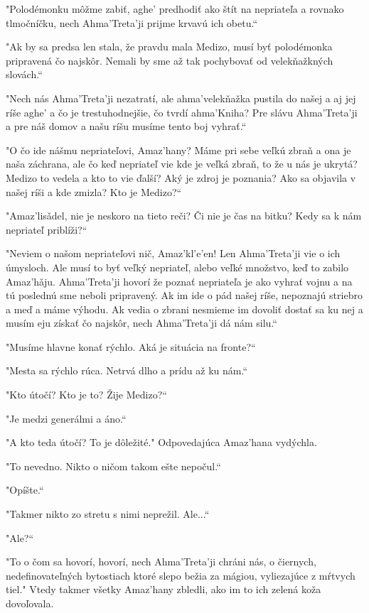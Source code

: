 \documentclass{book}
\begin{document}
"$ $Polodémonku môžme zabiť, aghe' predhodiť ako štít na nepriateľa a rovnako tlmočníčku, nech Ahma'Treta'ji prijme krvavú ich obetu.“

"$ $Ak by sa predsa len stala, že pravdu mala Medizo, musí byť polodémonka pripravená čo najskôr. Nemali by sme až tak pochybovať od velekňažkných slovách.“

"$ $Nech nás Ahma'Treta'ji nezatratí, ale ahma'velekňažka pustila do našej a aj jej ríše aghe' a čo je trestuhodnejšie, čo tvrdí ahma'Kniha? Pre slávu Ahma'Treta'ji a pre náš domov a našu ríšu musíme tento boj vyhrať.“

"$ $O čo ide nášmu nepriateľovi, Amaz'hany? Máme pri sebe veľkú zbraň a ona je naša záchrana, ale čo keď nepriateľ vie kde je veľká zbraň, to že u nás je ukrytá? Medizo to vedela a kto to vie ďalší? Aký je zdroj je poznania? Ako sa objavila v našej ríši a kde zmizla? Kto je Medizo?“

"$ $Amaz'lisa\v{}del, nie je neskoro na tieto reči? Či nie je čas na bitku? Kedy sa k nám nepriateľ priblíži?“

"$ $Neviem o našom nepriateľovi nič, Amaz'kl'e'en! Len Ahma'Treta'ji vie o ich úmysloch. Ale musí to byť veľký nepriateľ, alebo veľké množstvo, keď to zabilo Amaz'ha\v{}ju. Ahma'Treta'ji hovorí že poznať nepriateľa je ako vyhrať vojnu a na tú poslednú sme neboli pripravený. Ak im ide o pád našej ríše, nepoznajú striebro a meď a máme výhodu. Ak vedia o zbrani nesmieme im dovoliť dostať sa ku nej a musím eju získať čo najskôr, nech Ahma'Treta'ji dá nám silu.“

"$ $Musíme hlavne konať rýchlo. Aká je situácia na fronte?“

"$ $Mesta sa rýchlo rúca. Netrvá dlho a prídu až ku nám.“

"$ $Kto útočí? Kto je to? Žije Medizo?“

"$ $Je medzi generálmi a áno.“

"$ $A kto teda útočí? To je dôležité."$ $ Odpovedajúca Amaz'hana vydýchla.

"$ $To nevedno. Nikto o ničom takom ešte nepočul.“

"$ $Opíšte.“

"$ $Takmer nikto zo stretu s nimi neprežil. Ale...“

"$ $Ale?“

"$ $To o čom sa hovorí, hovorí, nech Ahma'Treta'ji chráni nás, o čiernych, nedefinovateľných bytostiach ktoré slepo bežia za mágiou, vyliezajúce z mŕtvych tiel."$ $ Vtedy takmer všetky Amaz'hany zbledli, ako im to ich zelená koža dovoľovala.
\end{document}
